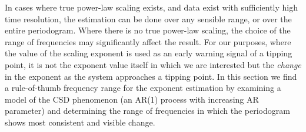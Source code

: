 \documentclass[10pt]{iopart}
\begin{document}
In cases where true power-law scaling exists, and data exist with sufficiently high time resolution, the estimation can be done over any sensible range, or over the entire periodogram. Where there is no true power-law scaling, the choice of the range of frequencies may significantly affect the result. For our purposes, where the value of the scaling exponent is used as an early warning signal of a tipping point, it is not the exponent value itself in which we are interested but the \emph{change} in the exponent as the system approaches a tipping point. In this section we find a rule-of-thumb frequency range for the exponent estimation by examining a model of the CSD phenomenon (an AR(1) process with increasing AR parameter) and determining the range of frequencies in which the periodogram shows most consistent and visible change. 
\end{document}
